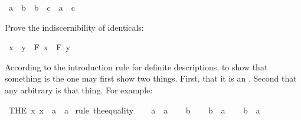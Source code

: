 \begin{isabellebody}
\begin{isamarkuptext}
\end{isamarkuptext}\isamarkuptrue%
\isamarkupfalse%
\ {\isachardoublequoteopen}a\ {\isacharequal}\ b\ {\isasymlongrightarrow}\ b\ {\isacharequal}\ c\ {\isasymlongrightarrow}\ a\ {\isacharequal}\ c{\isachardoublequoteclose}%
\isadelimproof
\ %
\endisadelimproof
%
\isatagproof
{}\isamarkupfalse%
%
\endisatagproof
{\isafoldproof}%
%
\isadelimproof
%
\endisadelimproof
%
\begin{isamarkuptext}%
\begin{Exercise}[title = The Indiscernibility of Identity] Prove the indiscernibility of identicals: \end{Exercise}%
\end{isamarkuptext}\isamarkuptrue%
\isamarkupfalse%
\ {\isachardoublequoteopen}x\ {\isacharequal}\ y\ {\isasymlongrightarrow}\ {\isacharparenleft}F\ x\ {\isasymlongleftrightarrow}\ F\ y{\isacharparenright}{\isachardoublequoteclose}%
\isadelimproof
\ %
\endisadelimproof
%
\isatagproof
{}\isamarkupfalse%
%
\endisatagproof
{\isafoldproof}%
%
\isadelimproof
%
\endisadelimproof
%
\isamarkuptrue%
%
\begin{isamarkuptext}%
According to the introduction rule for definite descriptions, to show that something is
the  one may first show two things. First, that it is an . Second that any
arbitrary  is that thing. For example:%
\end{isamarkuptext}\isamarkuptrue%
\isamarkupfalse%
\ {\isachardoublequoteopen}{\isacharparenleft}THE\ x{\isachardot}\ x\ {\isacharequal}\ a{\isacharparenright}\ {\isacharequal}\ a{\isachardoublequoteclose}\isanewline
%
\isadelimproof
%
\endisadelimproof
%
\isatagproof
{}\isamarkupfalse%
\ {\isacharparenleft}rule\ the{\isacharunderscore}equality{\isacharparenright}\isanewline
\ \ \isamarkupfalse%
\ {\isachardoublequoteopen}a\ {\isacharequal}\ a{\isachardoublequoteclose}\isacommand{{\isachardot}{\isachardot}}\isamarkupfalse%
\isanewline
{}\isamarkupfalse%
\isanewline
\ \ \isamarkupfalse%
\ b\isanewline
\ \ \isamarkupfalse%
\ {\isachardoublequoteopen}b\ {\isacharequal}\ a{\isachardoublequoteclose}\isanewline
\ \ \isamarkupfalse%
\ {\isachardoublequoteopen}b\ {\isacharequal}\ a{\isachardoublequoteclose}\isacommand{{\isachardot}}\isamarkupfalse%
\isanewline
{}\isamarkupfalse%
%
\endisatagproof
{\isafoldproof}%
%
\isadelimproof

\end{isabellebody}
